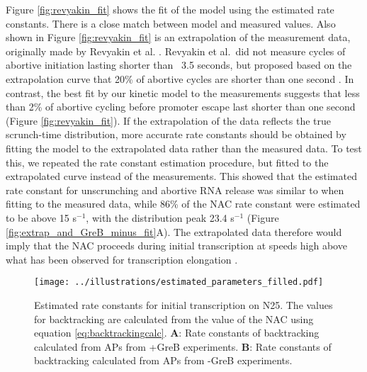 Figure \ref{fig:revyakin_fit} shows the fit of the model using the estimated
rate constants. There is a close match between model and measured values. Also
shown in Figure \ref{fig:revyakin_fit} is an extrapolation of the measurement
data, originally made by Revyakin et al. \cite{revyakin_abortive_2006}.
Revyakin et al.\ did not measure cycles of abortive initiation lasting shorter
than ~3.5 seconds, but proposed based on the extrapolation curve that 20\% of
abortive cycles are shorter than one second \cite{revyakin_abortive_2006}.  In
contrast, the best fit by our kinetic model to the measurements suggests that
less than 2\% of abortive cycling before promoter escape last shorter than one
second (Figure \ref{fig:revyakin_fit}). If the extrapolation of the data
reflects the true scrunch-time distribution, more accurate rate constants
should be obtained by fitting the model to the extrapolated data rather than
the measured data. To test this, we repeated the rate constant estimation
procedure, but fitted to the extrapolated curve instead of the measurements.
This showed that the estimated rate constant for unscrunching and abortive RNA
release was similar to when fitting to the measured data, while 86\% of 
the NAC rate constant were estimated to be above 15 s$^{-1}$, with the
distribution peak 23.4 s$^{-1}$ (Figure \ref{fig:extrap_and_GreB_minus_fit}A).
The extrapolated data therefore would imply that the NAC proceeds during
initial transcription at speeds high above what has been observed for
transcription elongation \cite{revyakin_abortive_2006}.

\begin{figure}
	\begin{center}
      \texttt{[image: ../illustrations/estimated\_parameters\_filled.pdf]}
	\end{center}
    \caption{Estimated rate constants for initial transcription on N25. The
        values for backtracking are calculated from the value of the NAC using
        equation \eqref{eq:backtrackingcalc}. \textbf{A}: Rate constants of
        backtracking calculated from APs from +GreB experiments. \textbf{B}:
        Rate constants of backtracking calculated from APs from -GreB
        experiments.}
    \label{fig:estimated_parameters}
\end{figure}

